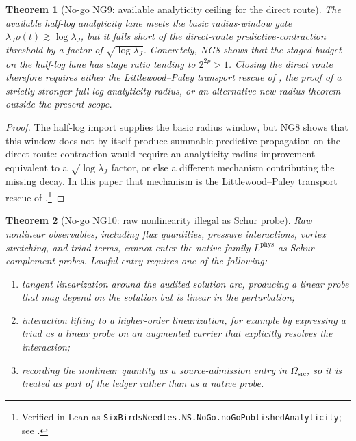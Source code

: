 \documentclass[11pt]{article}
\newcommand{\Lphys}{L^{\mathrm{phys}}}
\newcommand{\Omsrc}{\Omega_{\mathrm{src}}}
\newcommand{\lambdaJ}{\lambda_J}
\newtheorem{theorem}{Theorem}[section]
\theoremstyle{definition}
\begin{document}
\begin{theorem}[No-go NG9: available analyticity ceiling for the direct route]
\label{thm:ns:no-go-published-analyticity}
The available half-log analyticity lane meets the basic radius-window
gate \(\lambdaJ\rho(t)\gtrsim\log\lambdaJ\), but it falls short of the
direct-route predictive-contraction threshold by a factor of
\(\sqrt{\log\lambdaJ}\).  Concretely, NG8 shows that the staged budget
on the half-log lane has stage ratio tending to \(2^{2p}>1\).  Closing
the direct route therefore requires either the Littlewood--Paley
transport rescue of , the proof of a
strictly stronger full-log analyticity radius, or an alternative
new-radius theorem outside the present scope.
\end{theorem}

\begin{proof}
The half-log import supplies the basic radius window, but NG8 shows
that this window does not by itself produce summable predictive
propagation on the direct route: contraction would require an
analyticity-radius improvement equivalent to a
\(\sqrt{\log\lambdaJ}\) factor, or else a different mechanism
contributing the missing decay.  In this paper that mechanism is the
Littlewood--Paley transport rescue of .\footnote{Verified in Lean as \texttt{SixBirdsNeedles.NS.NoGo.noGoPublishedAnalyticity}; see .}
\end{proof}

\begin{theorem}[No-go NG10: raw nonlinearity illegal as Schur probe]
\label{thm:ns:no-go-raw-nonlinearity}
Raw nonlinear observables, including flux quantities, pressure
interactions, vortex stretching, and triad terms, cannot enter the
native family \(\Lphys\) as Schur-complement probes.  Lawful entry
requires one of the following:
\begin{enumerate}[label=(\roman*)]
\item tangent linearization around the audited solution arc, producing a
linear probe that may depend on the solution but is linear in the
perturbation;
\item interaction lifting to a higher-order linearization, for example
by expressing a triad as a linear probe on an augmented carrier that
explicitly resolves the interaction;
\item recording the nonlinear quantity as a source-admission entry in
\(\Omsrc\), so it is treated as part of the ledger rather than as a
native probe.
\end{enumerate}
\end{theorem}
\end{document}
